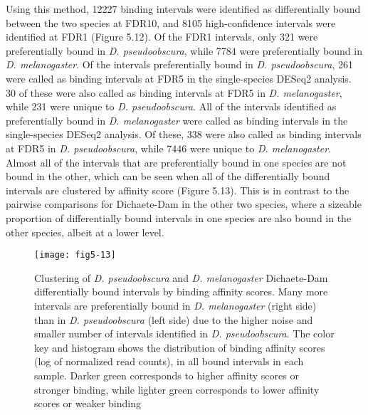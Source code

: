 Using this method, 12227 binding intervals were identified as differentially bound between the two species at FDR10, and 8105 high-confidence intervals were identified at FDR1 (Figure 5.12). Of the FDR1 intervals, only 321 were preferentially bound in \emph{D. pseudoobscura}, while 7784 were preferentially bound in \emph{D. melanogaster}. Of the intervals preferentially bound in \emph{D. pseudoobscura}, 261 were called as binding intervals at FDR5 in the single-species DESeq2 analysis. 30 of these were also called as binding intervals at FDR5 in \emph{D. melanogaster}, while 231 were unique to \emph{D. pseudoobscura}. All of the intervals identified as preferentially bound in \emph{D. melanogaster} were called as binding intervals in the single-species DESeq2 analysis. Of these, 338 were also called as binding intervals at FDR5 in \emph{D. pseudoobscura}, while 7446 were unique to \emph{D. melanogaster}. Almost all of the intervals that are preferentially bound in one species are not bound in the other, which can be seen when all of the differentially bound intervals are clustered by affinity score (Figure 5.13). This is in contrast to the pairwise comparisons for Dichaete-Dam in the other two species, where a sizeable proportion of differentially bound intervals in one species are also bound in the other species, albeit at a lower level.

\begin{figure}
\centering
\texttt{[image: fig5-13]}
\caption[Clustering of \emph{D. pseudoobscura} and \emph{D. melanogaster} Dichaete-Dam differentially bound intervals by binding affinity scores]{Clustering of \emph{D. pseudoobscura} and \emph{D. melanogaster} Dichaete-Dam differentially bound intervals by binding affinity scores. Many more intervals are preferentially bound in \emph{D. melanogaster} (right side) than in \emph{D. pseudoobscura} (left side) due to the higher noise and smaller number of intervals identified in \emph{D. pseudoobscura}. The color key and histogram shows the distribution of binding affinity scores (log of normalized read counts), in all bound intervals in each sample. Darker green corresponds to higher affinity scores or stronger binding, while lighter green corresponds to lower affinity scores or weaker binding}
\label{Figure 5.13}
\end{figure}

